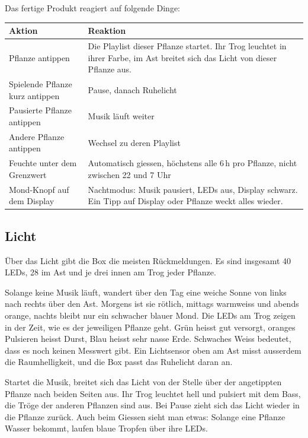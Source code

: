 \documentclass[11pt,a4paper]{article}
\begin{document}
Das fertige Produkt reagiert auf folgende Dinge: 
\begin{table}[H]
\centering
\begin{tabularx}{\linewidth}{>{\raggedright\arraybackslash}p{4.6cm}L}
\toprule
\textbf{Aktion} & \textbf{Reaktion} \\
\midrule
Pflanze antippen & Die Playlist dieser Pflanze startet. Ihr Trog leuchtet in ihrer Farbe, im Ast breitet sich das Licht von dieser Pflanze aus. \\
Spielende Pflanze kurz antippen & Pause, danach Ruhelicht \\
Pausierte Pflanze antippen & Musik läuft weiter \\
Andere Pflanze antippen & Wechsel zu deren Playlist \\
Feuchte unter dem Grenzwert & Automatisch giessen, höchstens alle 6\,h pro Pflanze, nicht zwischen 22 und 7 Uhr \\
Mond-Knopf auf dem Display & Nachtmodus: Musik pausiert, LEDs aus, Display schwarz. Ein Tipp auf Display oder Pflanze weckt alles wieder. \\
\bottomrule
\end{tabularx}
\end{table}

\subsection{Licht}

Über das Licht gibt die Box die meisten Rückmeldungen. Es sind insgesamt 40 LEDs, 28 im Ast und je drei innen am Trog jeder Pflanze.

Solange keine Musik läuft, wandert über den Tag eine weiche Sonne von links nach rechts über den Ast. Morgens ist sie rötlich, mittags warmweiss und abends orange, nachts bleibt nur ein schwacher blauer Mond. Die LEDs am Trog zeigen in der Zeit, wie es der jeweiligen Pflanze geht. Grün heisst gut versorgt, oranges Pulsieren heisst Durst, Blau heisst sehr nasse Erde. Schwaches Weiss bedeutet, dass es noch keinen Messwert gibt. Ein Lichtsensor oben am Ast misst ausserdem die Raumhelligkeit, und die Box passt das Ruhelicht daran an.

Startet die Musik, breitet sich das Licht von der Stelle über der angetippten Pflanze nach beiden Seiten aus. Ihr Trog leuchtet hell und pulsiert mit dem Bass, die Tröge der anderen Pflanzen sind aus. Bei Pause zieht sich das Licht wieder in die Pflanze zurück. Auch beim Giessen sieht man etwas: Solange eine Pflanze Wasser bekommt, laufen blaue Tropfen über ihre LEDs.
\end{document}
